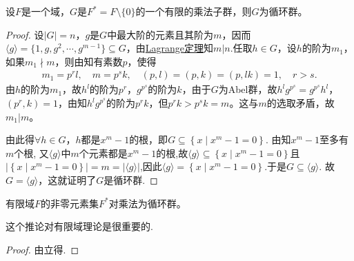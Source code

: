 \documentclass[../../main.tex]{subfiles}%
\begin{document}
\begin{theorem}\label{theorem:抽象代数--定理2.6.2}
设$F$是一个域，$G$是$F^*=F\setminus\{0\}$的一个有限的乘法子群，则$G$为循环群。
\end{theorem}
\begin{proof}
设$|G|=n$，$g$是$G$中最大阶的元素且其阶为$m$，因而$\langle g\rangle=\{1,g,g^2,\cdots,g^{m-1}\}\subseteq G$，由\hyperref[theorem:抽象代数--Lagrange定理]{Lagrange定理}知$m|n$.任取$h\in G$，设$h$的阶为$m_1$，如果$m_1\nmid m$，则由知有素数$p$，使得
\begin{align*}
m_1=p^rl,\quad m=p^sk,\quad (p,l)=(p,k)=(p,lk)=1,\quad r>s.
\end{align*}
由$h$的阶为$m_1$，故$h^l$的阶为$p^r$，$g^{p^s}$的阶为$k$，由于$G$为Abel群，故$h^lg^{p^s}=g^{p^s}h^l$，$(p^r,k)=1$，由知$h^lg^{p^s}$的阶为$p^rk$，但$p^rk>p^sk=m$。这与$m$的选取矛盾，故$m_1|m$。

由此得$\forall h\in G$，$h$都是$x^m-1$的根，即$G\subseteq \left\{ x\mid x^m-1=0 \right\} .$
由知$x^m-1$至多有$m$个根,
又$\langle g\rangle$中$m$个元素都是$x^m-1$的根,故$\langle g\rangle\subseteq \left\{ x\mid x^m-1=0 \right\}$且$\left| \left\{ x\mid x^m-1=0 \right\} \right|=m=|\langle g\rangle|$,因此$\langle g\rangle= \left\{ x\mid x^m-1=0 \right\}.$于是$G\subseteq \langle g\rangle.$
故$G=\langle g\rangle$，这就证明了$G$是循环群.
\end{proof}

\begin{corollary}\label{corollary:抽象代数--推论2.6.4}
有限域$F$的非零元素集$F^*$对乘法为循环群。
\end{corollary}
\begin{remark}
这个推论对有限域理论是很重要的.
\end{remark}
\begin{proof}
由立得.
\end{proof}
\end{document}
